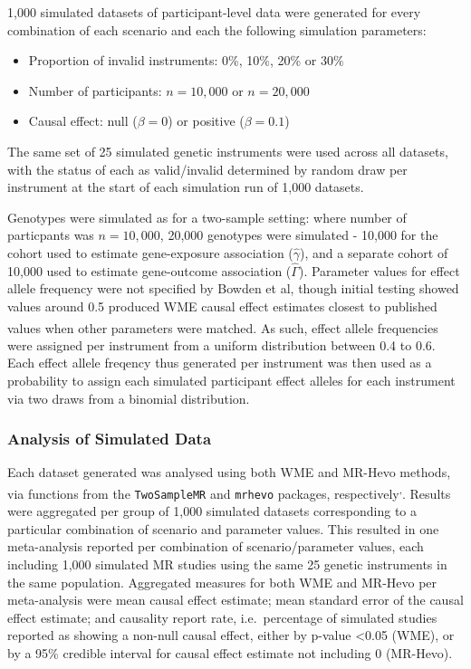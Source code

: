 \documentclass[
]{article}
\providecommand{\tightlist}{%
  \setlength{\itemsep}{0pt}\setlength{\parskip}{0pt}}
\begin{document}
1,000 simulated datasets of participant-level data were generated for every combination of each scenario and each the following simulation parameters:

\begin{itemize}
\tightlist
\item
  Proportion of invalid instruments: 0\%, 10\%, 20\% or 30\%
\item
  Number of participants: \(n = 10,000\) or \(n = 20,000\)
\item
  Causal effect: null (\(\beta = 0\)) or positive (\(\beta = 0.1\))
\end{itemize}

The same set of 25 simulated genetic instruments were used across all datasets, with the status of each as valid/invalid determined by random draw per instrument at the start of each simulation run of 1,000 datasets.

Genotypes were simulated as for a two-sample setting: where number of particpants was \(n = 10,000\), 20,000 genotypes were simulated - 10,000 for the cohort used to estimate gene-exposure association (\(\hat{\gamma}\)), and a separate cohort of 10,000 used to estimate gene-outcome association (\(\hat{\Gamma}\)). Parameter values for effect allele frequency were not specified by Bowden et al, though initial testing showed values around 0.5 produced WME causal effect estimates closest to published values when other parameters were matched\textsuperscript{}. As such, effect allele frequencies were assigned per instrument from a uniform distribution between 0.4 to 0.6. Each effect allele freqency thus generated per instrument was then used as a probability to assign each simulated participant effect alleles for each instrument via two draws from a binomial distribution.

\subsubsection{Analysis of Simulated Data}\label{analysis-of-simulated-data}

Each dataset generated was analysed using both WME and MR-Hevo methods, via functions from the \texttt{TwoSampleMR} and \texttt{mrhevo} packages, respectively\textsuperscript{,}. Results were aggregated per group of 1,000 simulated datasets corresponding to a particular combination of scenario and parameter values. This resulted in one meta-analysis reported per combination of scenario/parameter values, each including 1,000 simulated MR studies using the same 25 genetic instruments in the same population. Aggregated measures for both WME and MR-Hevo per meta-analysis were mean causal effect estimate; mean standard error of the causal effect estimate; and causality report rate, i.e.~percentage of simulated studies reported as showing a non-null causal effect, either by p-value \textless0.05 (WME), or by a 95\% credible interval for causal effect estimate not including 0 (MR-Hevo).
\end{document}
